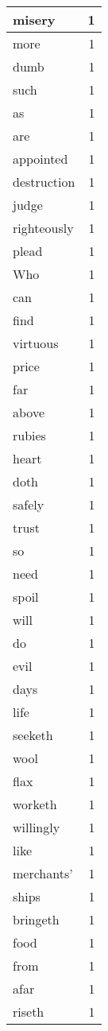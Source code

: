 \begin{center}
\begin{longtable}{l|r}
misery & 1\\ \hline 
more & 1\\ \hline 
dumb & 1\\ \hline 
such & 1\\ \hline 
as & 1\\ \hline 
are & 1\\ \hline 
appointed & 1\\ \hline 
destruction & 1\\ \hline 
judge & 1\\ \hline 
righteously & 1\\ \hline 
plead & 1\\ \hline 
Who & 1\\ \hline 
can & 1\\ \hline 
find & 1\\ \hline 
virtuous & 1\\ \hline 
price & 1\\ \hline 
far & 1\\ \hline 
above & 1\\ \hline 
rubies & 1\\ \hline 
heart & 1\\ \hline 
doth & 1\\ \hline 
safely & 1\\ \hline 
trust & 1\\ \hline 
so & 1\\ \hline 
need & 1\\ \hline 
spoil & 1\\ \hline 
will & 1\\ \hline 
do & 1\\ \hline 
evil & 1\\ \hline 
days & 1\\ \hline 
life & 1\\ \hline 
seeketh & 1\\ \hline 
wool & 1\\ \hline 
flax & 1\\ \hline 
worketh & 1\\ \hline 
willingly & 1\\ \hline 
like & 1\\ \hline 
merchants' & 1\\ \hline 
ships & 1\\ \hline 
bringeth & 1\\ \hline 
food & 1\\ \hline 
from & 1\\ \hline 
afar & 1\\ \hline 
riseth & 1\\ \hline 

\end{longtable}
\end{center}
